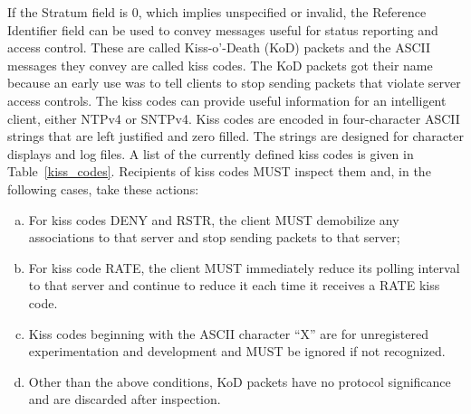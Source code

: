 If the Stratum field is 0, which implies unspecified or invalid, the
Reference Identifier field can be used to convey messages useful for
status reporting and access control. These are called Kiss-o'-Death
(KoD) packets and the ASCII messages they convey are called kiss
codes. The KoD packets got their name because an early use was to
tell clients to stop sending packets that violate server access
controls. The kiss codes can provide useful information for an
intelligent client, either NTPv4 or SNTPv4. Kiss codes are encoded
in four-character ASCII strings that are left justified and zero
filled. The strings are designed for character displays and log
files. A list of the currently defined kiss codes is given in
Table~\ref{kiss_codes}. Recipients of kiss codes MUST inspect them and, in the
following cases, take these actions:

\begin{enumerate}[a.]
  \item For kiss codes DENY and RSTR, the client MUST demobilize any
associations to that server and stop sending packets to that
server;
  \item For kiss code RATE, the client MUST immediately reduce its
polling interval to that server and continue to reduce it each
time it receives a RATE kiss code.
  \item Kiss codes beginning with the ASCII character ``X'' are for
unregistered experimentation and development and MUST be ignored
if not recognized.
  \item Other than the above conditions, KoD packets have no protocol
significance and are discarded after inspection.
\end{enumerate}

